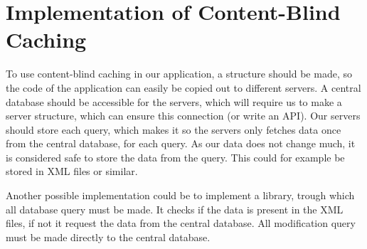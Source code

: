 \section{Implementation of Content-Blind Caching}
To use content-blind caching in our application, a structure should be made, so the code of the application can easily be copied out to different servers. A central database should be accessible for the servers, which will require us to make a server structure, which can ensure this connection (or write an API). 
Our servers should store each query, which makes it so the servers only fetches data once from the central database, for each query. As our data does not change much, it is considered safe to store the data from the query. This could for example be stored in XML files or similar.

Another possible implementation could be  to implement a library, trough which all database query must be made. It checks if the data is present in the XML files, if not it request the data from the central database. All modification query must be made directly to the central database.